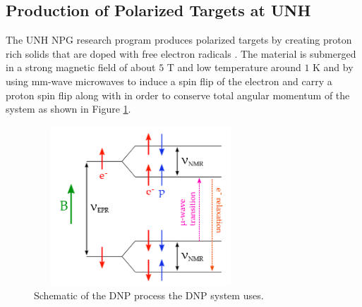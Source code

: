 \documentclass[12pt,notitlepage]{amsart}
\begin{document}
  \subsection{Production of Polarized Targets at UNH}  The UNH NPG research program produces polarized targets by creating proton rich solids that are doped with free electron radicals \cite{mellor}. The material is submerged in a strong magnetic field of about $5$ T and low temperature around $1$ K and by using mm-wave microwaves to induce a spin flip of the electron and carry a proton spin flip along with in order to conserve total angular momentum of the system as shown in Figure \ref{DNPprocess}. 
\begin{figure}[h]
\caption{Schematic of the DNP process the DNP system uses.}
\label{DNPprocess}
\centering
\includegraphics[width = 8cm,height = 6cm]{DNPprocess} 
\end{figure}
 
\end{document}
